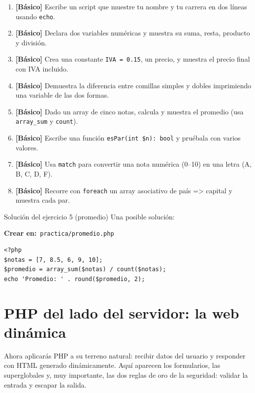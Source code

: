 \documentclass[11pt]{article}
\begin{document}
\begin{enumerate}[leftmargin=1.7em,itemsep=3pt,topsep=2pt]
\item \textbf{[Básico]} Escribe un script que muestre tu nombre y tu carrera en dos líneas usando \texttt{echo}.
\item \textbf{[Básico]} Declara dos variables numéricas y muestra su suma, resta, producto y división.
\item \textbf{[Básico]} Crea una constante \texttt{IVA =\allowbreak{} 0.\allowbreak{}15}, un precio, y muestra el precio final con IVA incluido.
\item \textbf{[Básico]} Demuestra la diferencia entre comillas simples y dobles imprimiendo una variable de las dos formas.
\item \textbf{[Básico]} Dado un array de cinco notas, calcula y muestra el promedio (usa \texttt{array\_sum} y \texttt{count}).
\item \textbf{[Básico]} Escribe una función \texttt{esPar(int \$n):\allowbreak{} bool} y pruébala con varios valores.
\item \textbf{[Básico]} Usa \texttt{match} para convertir una nota numérica (0–10) en una letra (A, B, C, D, F).
\item \textbf{[Básico]} Recorre con \texttt{foreach} un array asociativo de país =\textgreater{} capital y muestra cada par.
\end{enumerate}
\begin{cajatip}{Solución del ejercicio 5 (promedio)}
Una posible solución:\par
\end{cajatip}
{\small\color{phpazulo}\textbf{Crear en:}~}\texttt{practica/\allowbreak{}promedio.\allowbreak{}php}\par\nobreak\vspace{-1pt}
\begin{cajacodigo}[Solución 3.9.5]
\begin{lstlisting}[style=php]
<?php
$notas = [7, 8.5, 6, 9, 10];
$promedio = array_sum($notas) / count($notas);
echo 'Promedio: ' . round($promedio, 2);
\end{lstlisting}
\end{cajacodigo}
\vspace{2pt}
\section{PHP del lado del servidor: la web dinámica}
Ahora aplicarás PHP a su terreno natural: recibir datos del usuario y responder con HTML generado dinámicamente. Aquí aparecen los formularios, las superglobales y, muy importante, las dos reglas de oro de la seguridad: validar la entrada y escapar la salida.
\end{document}
